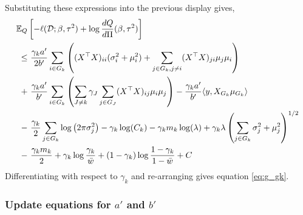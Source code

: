 Substituting these expressions into the previous display gives,
\begin{equation*}
\begin{aligned}
    \mathbb{E}_{Q} & \left[ 
	- \ell(\mathcal{D}; \beta, \tau^2) + \log \frac{dQ}{d\Pi}(\beta, \tau^2)
    \right]  \\
\leq &\
    \frac{\gamma_k a'}{2b'}
    \sum_{i \in G_k} \left( 
	    (X^\top X)_{ii} (\sigma_i^2 + \mu_i^2)
	+
	\sum_{j \in G_k, j\neq i} 
	    (X^\top X)_{ji} \mu_j \mu_i
    \right ) \\
+ &\
    \frac{\gamma_k a'}{b'}
    \sum_{i \in G_k} \left( 
    \sum_{J \neq k} \gamma_{J}
    \sum_{j \in G_J} (X^\top X)_{ij} 
	 \mu_i \mu_j
    \right )
-
    \frac{\gamma_k a'}{b'} \langle y, X_{G_k} \mu_{G_k} \rangle \\
- &\
    \frac{\gamma_k}{2} \sum_{j \in G_k} \log \left( 2 \pi \sigma_j^2 \right) 
-
    \gamma_k \log(C_k )
-
    \gamma_k m_k \log (\lambda) 
+
    \gamma_k \lambda \left( \sum_{j \in G_k} 
	\sigma_j^2 + \mu_j^2
    \right)^{1/2} \\
- &\
    \frac{\gamma_k m_k}{2} 
+ 
    \gamma_k \log \frac{\gamma_k}{\bar{w}}
+ 
    (1 - \gamma_k) \log \frac{1 - \gamma_k}{1 - \bar{w}}
+ C
\end{aligned}
\end{equation*}
Differentiating with respect to $\gamma_k$ and re-arranging gives equation \eqref{eq:g_gk}.

\subsubsection{Update equations for $a'$ and $b'$}

